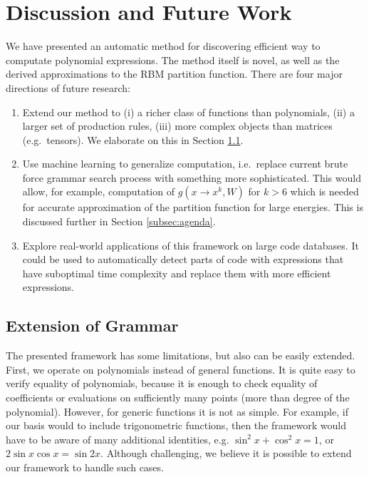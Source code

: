 \section{Discussion and Future Work}

We have presented an automatic method for discovering efficient way to
computate polynomial expressions. The method itself is novel, as well as the derived
approximations to the RBM partition function. There are four
major directions of future research: 

\begin{enumerate}
  \item Extend our method to (i) a richer class of functions
    than polynomials, (ii) a larger set of production rules, (iii) more complex
    objects than matrices (e.g.~tensors). We elaborate on this in
    Section \ref{sec:extend}.

  \item Use machine learning to generalize computation, i.e.~replace 
    current brute force grammar search process with something more
    sophisticated. This would allow, for example, computation of
$g(x \rightarrow x^k, W)$ for $k > 6$ which is needed for accurate
approximation of the partition function for large energies. This is discussed further in
Section \ref{subsec:agenda}.



\item Explore real-world applications of this framework on large code databases. 
  It could be used to automatically detect parts of code with expressions that have suboptimal 
  time complexity and replace them with more efficient expressions.
\end{enumerate}



\subsection{Extension of Grammar}
\label{sec:extend}
The presented framework has some limitations, but also can be easily extended. First,
we operate on polynomials instead of general functions. It is quite easy to verify
equality of polynomials, because it is enough to check equality of coefficients or
evaluations on sufficiently many points (more than degree of
the polynomial). However, for generic functions
it is not as simple. For example, if our basis would to include trigonometric functions, then the
framework would have to be aware of many additional identities,
e.g. $\sin^2{x} + \cos^2{x} = 1$, or $2\sin x \cos x = \sin
2x$. Although challenging, we believe it is possible to extend our
framework to handle such cases. 

